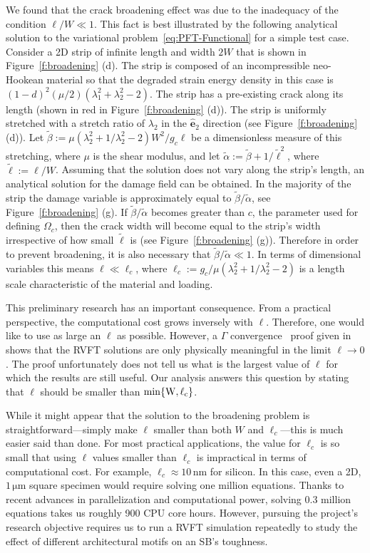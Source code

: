 \documentclass[10pt,letterpaper]{article}
\newcommand{\unit}[1]{\ensuremath{\, \mathrm{#1}}}
\begin{document}
    We found that the crack broadening effect was due to the inadequacy of the condition $\ell/W \ll 1$. This fact is best illustrated by the following analytical solution to the variational problem~\eqref{eq:PFT-Functional} for a simple test case. Consider a 2D strip of infinite length and width $2W$ that is shown in Figure~\ref{f:broadening} (d). The strip is composed of an incompressible neo-Hookean material so that the degraded strain energy density in this case is $(1-d)^2 (\mu/2)(\lambda_1^2+\lambda_2^2-2)$. The strip has a pre-existing crack along its length (shown in red in Figure~\ref{f:broadening} (d)). The strip is uniformly stretched with a stretch ratio of $\lambda_2$ in the $\hat{\mathbf{e}}_2$ direction (see Figure~\ref{f:broadening} (d)). Let  $\tilde{\beta}:= \mu (\lambda_2^2+1/\lambda_2^2-2) W^2 /g_c  \ell$ be a dimensionless measure of this stretching, where $\mu$ is the shear modulus, and let $\tilde{\alpha}:=\tilde{\beta}+1/\tilde{\ell}^{2}$, where $\tilde{\ell}:=\ell/W$. Assuming that the solution does not vary along the strip's length, an analytical solution for the damage field can be obtained. In the majority of the strip the damage variable is approximately equal to $ \tilde{\beta}/\tilde{\alpha}$, see Figure~\ref{f:broadening} (g). If $ \tilde{\beta}/\tilde{\alpha}$ becomes greater than $c$, the parameter used for defining $\Omega_c$, then the crack width will become equal to the strip's width irrespective of how small $\tilde{\ell}$ is (see Figure~\ref{f:broadening} (g)). Therefore in order to prevent broadening, it is also necessary that $\tilde{\beta}/\tilde{\alpha}\ll 1$. In terms of dimensional variables this means $\ell \ll \ell_c$, where $\ell_c:=g_c/\mu (\lambda_2^2+1/\lambda_2^2-2)$ is a length scale characteristic of the material and loading.

    This preliminary research has an important consequence. From a practical perspective, the computational cost grows inversely with $\ell$.  Therefore, one would like to use as large an $\ell$ as possible.  However, a $\mathit{\Gamma}$ convergence~\cite{braides2002gamma} proof given in~\cite{chambolle_2005, ambrosio_1990b} shows that the RVFT solutions are only physically meaningful in the limit $\ell\to 0$. The proof unfortunately does not tell us what is the largest value of $\ell$ for which the results are still useful. Our analysis answers this question by stating that $\ell$ should be smaller than $\rm{min}\{W, \ell_c\}$.

    While it might appear that the solution to the broadening problem is straightforward---simply make $\ell$ smaller than both $W$ and $\ell_c$---this is much easier said than done. For most practical applications, the value for $\ell_c$ is so small that using $\ell$ values smaller than $\ell_c$ is impractical in terms of computational cost. For example, $\ell_c\approx 10\unit{nm}$ for silicon. In this case, even a 2D, $1\unit{\mu m}$ square specimen would require solving one million equations.  Thanks to recent advances in parallelization and computational power, solving 0.3 million equations takes us roughly 900 CPU core hours. However, pursuing the project's research objective requires us to run a RVFT simulation repeatedly to study the effect of different architectural motifs on an SB's toughness.
\end{document}
